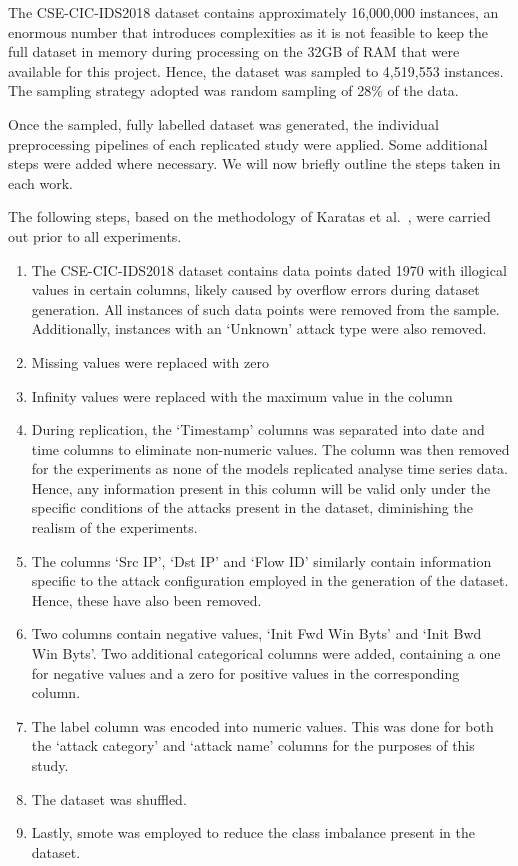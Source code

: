 The CSE-CIC-IDS2018 dataset contains approximately 16,000,000 instances, an
enormous number that introduces complexities as it is not feasible to keep the
full dataset in memory during processing on the 32GB of RAM that were available
for this project. Hence, the dataset was sampled to 4,519,553 instances. The
sampling strategy adopted was random sampling of 28\% of the data.

Once the sampled, fully labelled dataset was generated, the individual
preprocessing pipelines of each replicated study were applied. Some additional
steps were added where necessary. We will now briefly outline the steps taken
in each work.

The following steps, based on the methodology of Karatas et al.~\cite{Karatas},
were carried out prior to all experiments.

\begin{enumerate}
      \item The CSE-CIC-IDS2018 dataset contains data points dated 1970 with illogical
            values in certain columns, likely caused by overflow errors during dataset
            generation. All instances of such data points were removed from the sample.
            Additionally, instances with an `Unknown' attack type were also removed.
      \item Missing values were replaced with zero
      \item Infinity values were replaced with the maximum value in the column
      \item During replication, the `Timestamp' columns was separated into date and time
            columns to eliminate non-numeric values. The column was then removed for the
            experiments as none of the models replicated analyse time series data. Hence,
            any information present in this column will be valid only under the specific
            conditions of the attacks present in the dataset, diminishing the realism of
            the experiments.
      \item The columns `Src IP', `Dst IP' and `Flow ID' similarly contain information
            specific to the attack configuration employed in the generation of the dataset.
            Hence, these have also been removed.
      \item Two columns contain negative values, `Init Fwd Win Byts' and `Init Bwd Win
            Byts'. Two additional categorical columns were added, containing a one for
            negative values and a zero for positive values in the corresponding column.
      \item The label column was encoded into numeric values. This was done for both the
            `attack category' and `attack name' columns for the purposes of this study.
      \item The dataset was shuffled.
      \item Lastly, \gls{smote} was employed to reduce the class imbalance present in the
            dataset. %
\end{enumerate}

